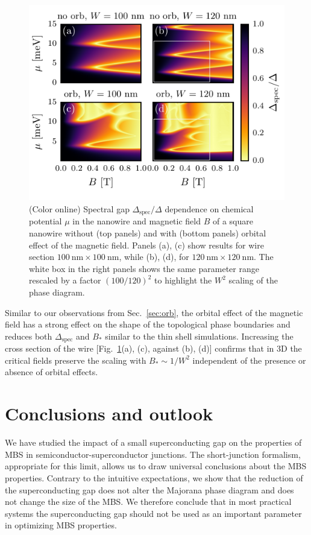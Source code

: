\begin{figure}
\includegraphics[width=\columnwidth]{chapter_shortjunction/figures/phase_diagrams_3d}
\caption{(Color online) Spectral gap $\Delta_\mathrm{spec}/\Delta$ dependence on chemical potential $\mu$ in the nanowire and magnetic field $B$ of a square nanowire without (top panels) and with (bottom panels) orbital effect of the magnetic field.
Panels (a), (c) show results for wire section $\SI{100}{\nm} \times \SI{100}{\nm}$, while (b), (d), for $\SI{120}{\nm} \times \SI{120}{\nm}$.
The white box in the right panels shows the same parameter range rescaled by a factor $\left(100/120\right)^2$ to highlight the $W^2$ scaling of the phase diagram.}
\label{fig:phase_diagrams_3d}
\end{figure}

Similar to our observations from Sec.~\ref{sec:orb}, the orbital effect of the magnetic field has a strong effect on the shape of the topological phase boundaries and reduces both $\Delta_\textrm{spec}$ and $B_*$ similar to the thin shell simulations.
Increasing the cross section of the wire [Fig.~\ref{fig:phase_diagrams_3d}(a), (c), against (b), (d)] confirms that in 3D the critical fields preserve the scaling with $B_*\sim 1/W^2$ independent of the presence or absence of orbital effects.

\section{Conclusions and outlook}
\label{sec:conc}

We have studied the impact of a small superconducting gap on the properties of MBS in semiconductor-superconductor junctions.
The short-junction formalism, appropriate for this limit, allows us to draw universal conclusions about the MBS properties.
Contrary to the intuitive expectations, we show that the reduction of the superconducting gap does not alter the Majorana phase diagram and does not change the size of the MBS.
We therefore conclude that in most practical systems the superconducting gap should not be used as an important parameter in optimizing MBS properties.

